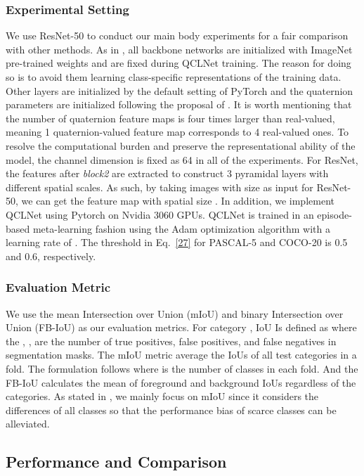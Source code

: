\documentclass[lettersize,journal]{IEEEtran}
\begin{document}
\subsubsection{Experimental Setting}
We use ResNet-50\cite{RN5} to conduct our main body experiments for a fair comparison with other methods. As in \cite{RN24,RN6}, all backbone networks are initialized with ImageNet\cite{RN78} pre-trained weights and are fixed during QCLNet training. The reason for doing so is to avoid them learning class-specific representations of the training data.  Other layers are initialized by the default setting of PyTorch and the quaternion parameters are initialized following the proposal of \cite{RN27}. It is worth mentioning that the number of quaternion feature maps is four times larger than real-valued, meaning 1 quaternion-valued feature map corresponds to 4 real-valued ones. To resolve the computational burden and preserve the representational ability of the model, the channel dimension  is fixed as 64 in all of the experiments. For ResNet, the features after \textit{block2} are extracted to construct 3 pyramidal layers with different spatial scales. As such, by taking images with size  as input for ResNet-50, we can get the feature map with spatial size . In addition, we implement QCLNet using Pytorch\cite{RN79} on Nvidia 3060 GPUs. QCLNet is trained in an episode-based meta-learning fashion using the Adam optimization algorithm\cite{RN80} with a learning rate of . The threshold  in Eq.~\ref{27} for PASCAL-5 and COCO-20 is 0.5 and 0.6, respectively.

\subsubsection{Evaluation Metric}
We use the mean Intersection over Union (mIoU) and binary Intersection over Union (FB-IoU) as our evaluation metrics. For category , IoU Is defined as  where the , ,  are the number of true positives, false positives, and false negatives in segmentation masks. The mIoU metric average the IoUs of all test categories in a fold. The formulation follows  where  is the number of classes in each fold. And the FB-IoU calculates the mean of foreground and background IoUs regardless of the categories. As stated in \cite{RN24}, we mainly focus on mIoU since it  considers the differences of all classes so that the performance bias of scarce classes can be alleviated.

\subsection{Performance and Comparison}
\end{document}
